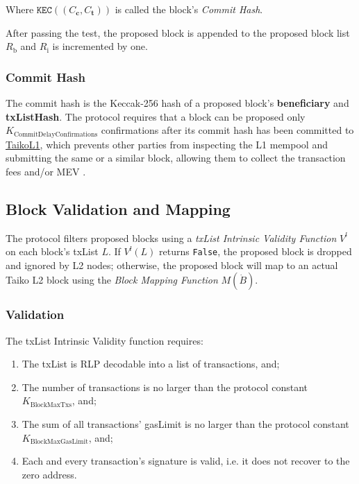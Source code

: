 \documentclass[9pt,oneside]{amsart}
\begin{document}
\begin{multicols}{2}
Where $\texttt{KEC}((C_{\mathbf{c}}, C_{\mathbf{t}}))$ is called the block's \emph{Commit Hash}.

After passing the test, the proposed block is appended to the proposed block list $R_\mathrm{b}$ and $R_\mathrm{i}$ is incremented by one.

\subsubsection{Commit Hash}\label{sec:commit} The commit hash is the Keccak-256 hash of a proposed block's \textbf{beneficiary} and \textbf{txListHash}. The protocol requires that a block can be proposed only $K_{\mathrm{CommitDelayConfirmations}}$ confirmations after its commit hash has been committed to \underline{TaikoL1}, which prevents other parties from inspecting the L1 mempool and submitting the same or a similar block, allowing them to collect the transaction fees and/or MEV \cite{mev}.

\subsection{Block Validation and Mapping } \label{sec:filtermap}
The protocol filters proposed blocks using a \emph{txList Intrinsic Validity Function} $V^l$ on each block's txList $L$. If $V^l(L)$ returns \texttt{False}, the proposed block is dropped and ignored by L2 nodes; otherwise, the proposed block will map to an actual Taiko L2 block using the \emph{Block Mapping Function} $M(\dot{B})$.

\subsubsection{Validation} The txList Intrinsic Validity function requires:

\begin{enumerate}
\item The txList is RLP decodable into a list of transactions, and;
\item The number of transactions is no larger than the protocol constant $ K_{\mathrm{BlockMaxTxs}}$, and;
\item The sum of all transactions' gasLimit is no larger than the protocol constant $K_{\mathrm{BlockMaxGasLimit}}$, and;
\item Each and every transaction's signature is valid, i.e. it does not recover to the zero address.
\end{enumerate}


\end{multicols}
\end{document}
